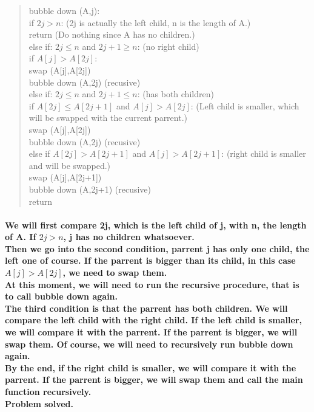 \documentclass{article}
\begin{document}
\begin{quote}
    bubble down (A,j):\\
    if $2j > n$: (2j is actually the left child, n is the length of A.)\\
        return (Do nothing since A has no children.)\\
    else if: $2j \leq n$ and $2j+1 \geq n$: (no right child)\\
        if $A[j] > A[2j]$:\\
            swap (A[j],A[2j])\\
            bubble down (A,2j) (recusive)\\
    else if: $2j \leq n$ and $2j+1 \leq n$: (has both children)\\
        if $A[2j] \leq A[2j+1]$ and $A[j] > A[2j]$: (Left child is smaller, which will be swapped with the current parrent.)\\
            swap (A[j],A[2j])\\
            bubble down (A,2j) (recusive)\\
        else if $A[2j] > A[2j+1]$ and $A[j] > A[2j+1]$: (right child is smaller and will be swapped.)\\
            swap (A[j],A[2j+1])\\
            bubble down (A,2j+1) (recusive)\\
    return\\
\end{quote}

\paragraph{We will first compare 2j, which is the left child of j, with n, the length of A.
If $2j > n $, j has no children whatsoever. \\
Then we go into the second condition, parrent j has only one child, the left one of course.
If the parrent is bigger than its child, in this case $A[j] > A[2j]$, we need to swap them.\\
At this moment, we will need to run the recursive procedure, that is to call bubble down again.\\
The third condition is that the parrent has both children. We will compare the left child with the right child. 
If the left child is smaller, we will compare it with the parrent. If the parrent is bigger, we will swap them. 
Of course, we will need to recursively run bubble down again.\\
By the end, if the right child is smaller, we will compare it with the parrent. 
If the parrent is bigger, we will swap them and call the main function recursively.\\
Problem solved.\\}
\end{document}
